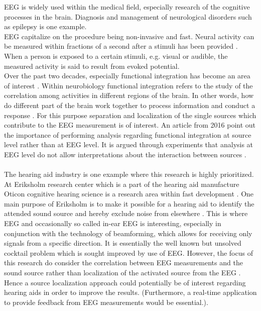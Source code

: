 \noindent
EEG is widely used within the medical field, especially research of the cognitive processes in the brain. 
Diagnosis and management of neurological disorders such as epilepsy is one example.
\\
EEG capitalize on the procedure being non-invasive and fast.
Neural activity can be measured within fractions of a second after a stimuli has been provided \cite[p. 3]{fundamentalEEG}. 
When a person is exposed to a certain stimuli, e.g. visual or audible, the measured activity is said to result from evoked potential.
\\
Over the past two decades, especially functional integration has become an area of interest \cite{Friston2011}. 
Within neurobiology functional integration refers to the study of the correlation among activities in different regions of the brain. 
In other words, how do different part of the brain work together to process information and conduct a response \cite{Friston2002}.     
For this purpose separation and localization of the single sources which contribute to the EEG measurement is of interest. 
An article from 2016 point out the importance of performing analysis regarding functional integration at source level rather than at EEG level. 
It is argued through experiments that analysis at EEG level do not allow interpretations about the interaction between sources \cite{Van2019}.  
\\ \\
The hearing aid industry is one example where this research is highly prioritized. 
At Eriksholm research center which is a part of the hearing aid manufacture Oticon cognitive hearing science is a research area within fast development \cite{Weberik}. 
One main purpose of Eriksholm is to make it possible for a hearing aid to identify the attended sound source and hereby exclude noise from elsewhere \cite{Emina2019} \cite{Bech2018}. 
This is where EEG and occasionally so called in-ear EEG is interesting, especially in conjunction with the technology of beamforming, which allows for receiving only signals from a specific direction. 
It is essentially the well known but unsolved cocktail problem which is sought improved by use of EEG. 
However, the focus of this research do consider the correlation between EEG measurements and the sound source rather than localization of the activated source from the EEG \cite{Emina2019}. 
Hence a source localization approach could potentially be of interest regarding hearing aids in order to improve the results.
(Furthermore, a real-time application to provide feedback from EEG measurements would be essential.). 

